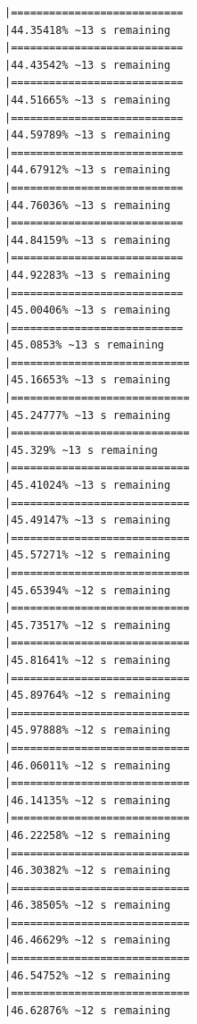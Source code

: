 \documentclass{article}\usepackage[]{graphicx}\usepackage[]{xcolor}
\makeatletter
\newenvironment{kframe}{%
 \def\at@end@of@kframe{}%
 \ifinner\ifhmode%
  \def\at@end@of@kframe{\end{minipage}}%
  \begin{minipage}{\columnwidth}%
 \fi\fi%
 \def\FrameCommand##1{\hskip\@totalleftmargin \hskip-\fboxsep
 \colorbox{shadecolor}{##1}\hskip-\fboxsep
     \hskip-\linewidth \hskip-\@totalleftmargin \hskip\columnwidth}%
 \MakeFramed {\advance\hsize-\width
   \@totalleftmargin\z@ \linewidth\hsize
   \@setminipage}}%
 {\par\unskip\endMakeFramed%
 \at@end@of@kframe}
\newenvironment{knitrout}{}{} %
\makeatother
\begin{document}
\begin{knitrout}
\begin{kframe}
\begin{verbatim}
|===========================                                   |44.35418% ~13 s remaining 
|===========================                                   |44.43542% ~13 s remaining 
|===========================                                   |44.51665% ~13 s remaining 
|===========================                                   |44.59789% ~13 s remaining 
|===========================                                   |44.67912% ~13 s remaining 
|===========================                                   |44.76036% ~13 s remaining 
|===========================                                   |44.84159% ~13 s remaining 
|===========================                                   |44.92283% ~13 s remaining 
|===========================                                   |45.00406% ~13 s remaining 
|===========================                                   |45.0853% ~13 s remaining  
|============================                                  |45.16653% ~13 s remaining 
|============================                                  |45.24777% ~13 s remaining 
|============================                                  |45.329% ~13 s remaining   
|============================                                  |45.41024% ~13 s remaining 
|============================                                  |45.49147% ~13 s remaining 
|============================                                  |45.57271% ~12 s remaining 
|============================                                  |45.65394% ~12 s remaining 
|============================                                  |45.73517% ~12 s remaining 
|============================                                  |45.81641% ~12 s remaining 
|============================                                  |45.89764% ~12 s remaining 
|============================                                  |45.97888% ~12 s remaining 
|============================                                  |46.06011% ~12 s remaining 
|============================                                  |46.14135% ~12 s remaining 
|============================                                  |46.22258% ~12 s remaining 
|============================                                  |46.30382% ~12 s remaining 
|============================                                  |46.38505% ~12 s remaining 
|============================                                  |46.46629% ~12 s remaining 
|============================                                  |46.54752% ~12 s remaining 
|============================                                  |46.62876% ~12 s remaining 

\end{verbatim}
\end{kframe}
\end{knitrout}
\end{document}
